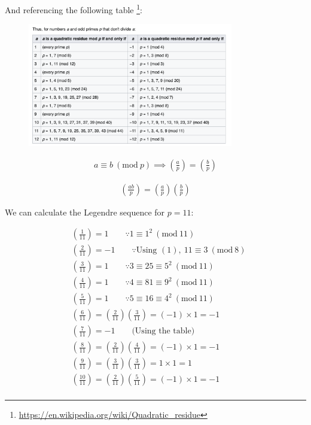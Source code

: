 \documentclass{article}
\newcommand{\modwos}[1]{\ (\mathrm{mod}\ #1)}
\begin{document}
And referencing the following table
\footnote{
    \url{https://en.wikipedia.org/wiki/Quadratic_residue}
}:

\begin{figure}[H]
    \centering
    \includegraphics[width=0.8\textwidth]{HW3_img/quadratic_residue.png}
\end{figure}



\begin{align*}
    a \equiv b \modwos{p} \implies \left(\frac{a}{p}\right) = \left(\frac{b}{p}\right) \tag{2}
\end{align*}

\begin{align*}
    \left(\frac{ab}{p}\right) = \left(\frac{a}{p}\right) \left(\frac{b}{p}\right) \tag{3}
\end{align*}

We can calculate the Legendre sequence for $p = 11$:

\begin{align*}
    & \left(\frac{1}{11}\right) = 1 \qquad \because 1 \equiv 1^2 \modwos{11} \\
    & \left(\frac{2}{11}\right) = -1 \qquad \because \text{Using }(1), \ 11 \equiv 3 \modwos{8} \\ 
    & \left(\frac{3}{11}\right) = 1 \qquad \because 3 \equiv 25 \equiv 5^2 \modwos{11} \\
    & \left(\frac{4}{11}\right) = 1 \qquad \because 4 \equiv 81 \equiv 9^2 \modwos{11} \\
    & \left(\frac{5}{11}\right) = 1 \qquad \because 5 \equiv 16 \equiv 4^2 \modwos{11} \\
    & \left(\frac{6}{11}\right) = \left(\frac{2}{11}\right) \left(\frac{3}{11}\right) = (-1) \times 1 = -1 \\
    & \left(\frac{7}{11}\right) = -1 \qquad \text{(Using the table)} \\
    & \left(\frac{8}{11}\right) = \left(\frac{2}{11}\right) \left(\frac{4}{11}\right) = (-1) \times 1 = -1 \\
    & \left(\frac{9}{11}\right) = \left(\frac{3}{11}\right) \left(\frac{3}{11}\right) = 1 \times 1 = 1 \\
    & \left(\frac{10}{11}\right) = \left(\frac{2}{11}\right) \left(\frac{5}{11}\right) = (-1) \times 1 = -1 \\
\end{align*}
\end{document}
